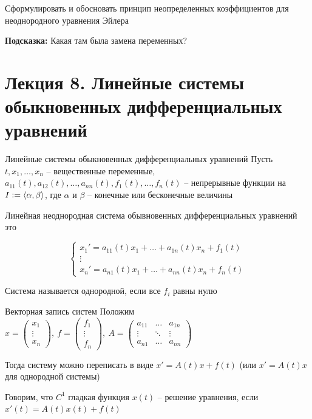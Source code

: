 \documentclass[12pt]{article}
\begin{document}
\begin{Exercise}{}
    Сформулировать и обосновать принцип неопределенных коэффициентов для неоднородного уравнения Эйлера 

    \textbf{Подсказка:} Какая там была замена переменных?
\end{Exercise}

\newpage 

\section{Лекция 8. Линейные системы обыкновенных дифференциальных уравнений}

\begin{defin}{Линейные системы обыкновенных дифференциальных уравнений}
    Пусть $t, x_1, \ldots, x_n$ -- вещественные переменные, $a_{11}(t), a_{12}(t), \ldots, a_{nn}(t), f_1(t), \ldots, f_n(t)$ -- непрерывные функции на $I := \langle \alpha, \beta \rangle$, где $\alpha$ и $\beta$ -- конечные или бесконечные величины 

    Линейная неоднородная система обывновенных дифференциальных уравнений это 

    \[ \begin{cases}
        x_1' = a_{11}(t)x_1 + \ldots + a_{1n}(t)x_n + f_1(t) \\
        \vdots \\
        x_n' = a_{n1}(t)x_1 + \ldots + a_{nn}(t)x_n + f_n(t)
    \end{cases} \]

    Система называется однородной, если все $f_i$ равны нулю
\end{defin}

\begin{nota}{Векторная запись систем}
    Положим $x = \begin{pmatrix}
        x_1 \\
        \vdots \\
        x_n
    \end{pmatrix},\ f = \begin{pmatrix}
        f_1 \\
        \vdots \\
        f_n
    \end{pmatrix},\ A = \begin{pmatrix}
        a_{11} & \ldots & a_{1n} \\
        \vdots & \ddots & \vdots \\
        a_{n1} & \ldots & a_{nn}
    \end{pmatrix}$

    Тогда систему можно переписать в виде $x' = A(t)x + f(t)$ (или $x' = A(t)x$ для однородной системы)

    Говорим, что $C^1$ гладкая функция $x(t)$ -- решение уравнения, если $x'(t) = A(t)x(t) + f(t)$
\end{nota}
\end{document}
